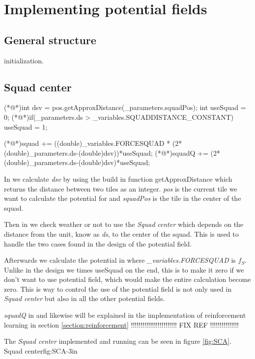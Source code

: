 \section{Implementing potential fields}
	
	\subsection{General structure}
	initialization.
	 
	
	\subsection{Squad center}	
		\begin{Sourcecode}[caption=Squad center]
(*@\lnote@*)int dsv = pos.getApproxDistance(_parameters.squadPos);	
int useSquad = 0;
(*@\lnote@*)if(_parameters.ds > _variables.SQUADDISTANCE_CONSTANT)
	useSquad = 1;

(*@\lnote@*)squad += ((double)_variables.FORCESQUAD * (2*(double)_parameters.ds-(double)dsv))*useSquad;
(*@\lnote@*)squadQ += (2*(double)_parameters.ds-(double)dsv)*useSquad;
\end{Sourcecode}
		In  we calculate \textit{dsv} by using the build in function getApproxDistance which returns the distance between two tiles as an integer. \textit{pos} is the current tile we want to calculate the potential for and \textit{squadPos} is the tile in the center of the squad.
		
		Then in  we check weather or not to use the \textit{Squad center} which depends on the distance from the unit, know as \textit{ds}, to the center of the squad. This is used to handle the two cases found in the design of the potential field.
		
		Afterwards we calculate the potential in  where \textit{\_variables.FORCESQUAD} is $f_{S}$. Unlike in the design we times useSquad on the end, this is to make it zero if we don't want to use potential field, which would make the entire calculation become zero. This is way to control the use of the potential field is not only used in \textit{Squad center} but also in all the other potential fields.
		
		\textit{squadQ} in  and likewise will be explained in the implementation of reinforcement learning in section \ref{section:reinforcement} !!!!!!!!!!!!!!!!!!!!!!!! FIX REF !!!!!!!!!!!!!!!
		
		The \textit{Squad center} implemented and running can be seen in figure \ref{fig:SCA}.
			{Squad center}{fig:SCA}{-3in}
			
